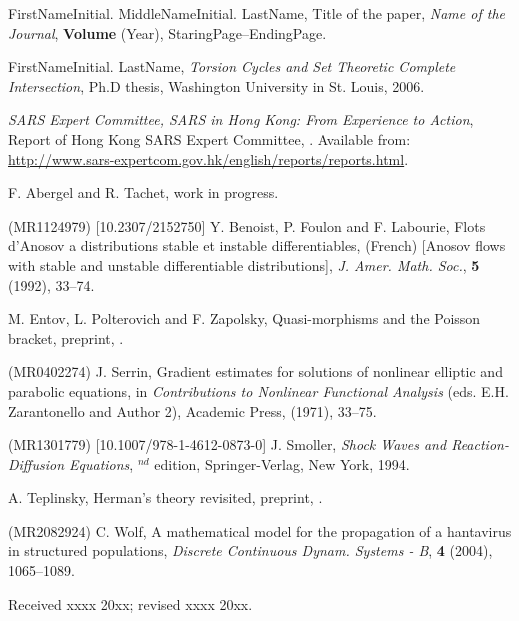 \documentclass{aims}
\theoremstyle{definition}
\begin{document}
\begin{thebibliography}{99}

     \newblock  FirstNameInitial.  MiddleNameInitial. LastName, %
     \newblock Title of the paper,
     \newblock \emph{Name of the Journal}, \textbf{Volume} (Year), StaringPage--EndingPage.

    \newblock FirstNameInitial. LastName,
    \newblock  \emph{Torsion Cycles and Set Theoretic Complete Intersection},
    \newblock  Ph.D thesis, Washington University in St. Louis, 2006.

\newblock
\newblock \emph{SARS Expert Committee, SARS in Hong Kong: From Experience to
Action}, Report of Hong Kong SARS Expert Committee,
. Available from: \url{http://www.sars-expertcom.gov.hk/english/reports/reports.html}.

\newblock F. Abergel and R. Tachet,
\newblock
\newblock work in progress.



 (MR1124979) [10.2307/2152750]
    \newblock Y. Benoist, P. Foulon and F. Labourie, %
    \newblock Flots d'Anosov a distributions stable et instable
     differentiables,
    \newblock (French) [Anosov flows with stable and unstable differentiable
     distributions], \emph{J. Amer. Math. Soc.}, \textbf{5} (1992), 33--74.

\newblock M. Entov, L. Polterovich and F. Zapolsky,
\newblock Quasi-morphisms and the Poisson bracket,
\newblock preprint, .

 (MR0402274)
    \newblock J. Serrin,
    \newblock  Gradient estimates for solutions of nonlinear elliptic
                     and parabolic equations,
    \newblock  in \emph{Contributions to Nonlinear Functional Analysis} (eds. E.H. Zarantonello and Author 2),
                Academic Press, (1971), 33--75.

 (MR1301779) [10.1007/978-1-4612-0873-0]
     \newblock J.  Smoller,
     \newblock \emph{Shock Waves and Reaction-Diffusion Equations},
     $^{nd}$ edition,  Springer-Verlag, New York, 1994.

\newblock A. Teplinsky,
\newblock Herman's theory revisited, preprint,
\newblock {}.

 (MR2082924)
     \newblock C.  Wolf,
     \newblock A mathematical model for the propagation of a hantavirus in structured populations,
     \newblock \emph{Discrete Continuous Dynam. Systems - B}, \textbf{4} (2004), 1065--1089.

\end{thebibliography}

\medskip
Received xxxx 20xx; revised xxxx 20xx.
\medskip
\end{document}
